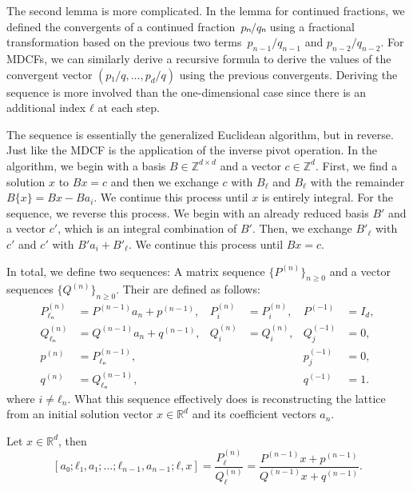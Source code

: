 The second lemma is more complicated.
In the lemma for continued fractions,
we defined the convergents of a continued fraction~$pₙ/qₙ$
using a fractional transformation based on the previous two
terms~$p_{n-1}/q_{n-1}$ and $p_{n-2}/q_{n-2}$.
For MDCFs, we can similarly derive a recursive formula to derive the values of
the convergent vector $(p₁/q, \dots, p_d/q)$ using the previous convergents.
Deriving the sequence is more involved than the one-dimensional case since
there is an additional index $ℓ$ at each step.

The sequence is essentially the generalized Euclidean algorithm, but in reverse.
Just like the MDCF is the application of the inverse pivot operation.
In the algorithm, we begin with a basis $B ∈ ℤ^{d×d}$ and a vector $c ∈ ℤ^d$.
First, we find a solution $x$ to $Bx = c$ and then we exchange $c$ with $B_ℓ$
and $B_ℓ$ with the remainder $B\{x\} = Bx - Ba_i$.
We continue this process until $x$ is entirely integral.
For the sequence, we reverse this process.
We begin with an already reduced basis $B'$ and a vector $c'$, which is an
integral combination of $B'$.
Then, we exchange $B'_{ℓ}$ with $c'$ and $c'$ with $B' a_i + B'_{ℓ}$.
We continue this process until $B x = c$.

In total, we define two sequences:
A matrix sequence $\{P^{(n)}\}_{n ≥ 0}$ and a vector sequences $\{Q^{(n)}\}_{n ≥ 0}$.
Their are defined as follows:
\begin{align*}
  P_{ℓₙ}^{(n)} & = P^{(n-1)} a_n + p^{(n-1)}, & P_i^{(n)} & = P_i^{(n)}, & P^{(-1)}   & = I_d, \\
  Q_{ℓₙ}^{(n)} & = Q^{(n-1)} a_n + q^{(n-1)}, & Q_i^{(n)} & = Q_i^{(n)}, & Q^{(-1)}_j & = 0,   \\
  p^{(n)}      & = P_{ℓₙ}^{(n-1)},            &           &              & p^{(-1)}_j & = 0,   \\
  q^{(n)}      & = Q_{ℓₙ}^{(n-1)},            &           &              & q^{(-1)}   & = 1.
\end{align*}
where $i ≠ ℓ_n$.
What this sequence effectively does is reconstructing the lattice from an
initial solution vector $x ∈ ℝ^d$ and its coefficient vectors $a_n$.

\begin{lemma}
  \label{lem:mdcf-wallis}
  Let $x ∈ ℝ^d$, then
  \[
    [a₀; ℓ₁, a₁; …; ℓ_{n-1}, a_{n-1}; ℓ, x]
    = \frac{P_ℓ^{(n)}}{Q_ℓ^{(n)}} = \frac{P^{(n-1)} x + p^{(n-1)}}{Q^{(n-1)} x + q^{(n-1)}}.
  \]
\end{lemma}

